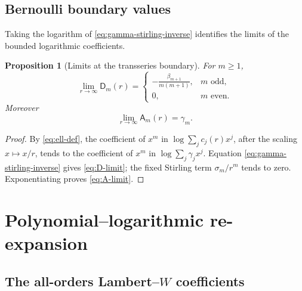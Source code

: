 \documentclass[11pt,a4paper]{article}
\newtheorem{proposition}[theorem]{Proposition}
\theoremstyle{definition}
\theoremstyle{remark}
\newcommand{\Bern}{\beta}
\newcommand{\cA}{\mathsf A}
\newcommand{\cD}{\mathsf D}
\begin{document}
\subsection{Bernoulli boundary values}

Taking the logarithm of \cref{eq:gamma-stirling-inverse} identifies the limits
of the bounded logarithmic coefficients.

\begin{proposition}[Limits at the transseries boundary]\label{prop:D-limits}
For \(m\ge1\),
\begin{equation}\label{eq:D-limit}
 \lim_{r\to\infty}\cD_m(r)=
 \begin{cases}
 \displaystyle-\frac{\Bern_{m+1}}{m(m+1)},&m\text{ odd},\\[2mm]
 0,&m\text{ even}.
 \end{cases}
\end{equation}
Moreover
\begin{equation}\label{eq:A-limit}
 \lim_{r\to\infty}\cA_m(r)=\gamma_m.
\end{equation}
\end{proposition}

\begin{proof}
By \cref{eq:ell-def}, the coefficient of \(x^m\) in
\(\log\sum_jc_j(r)x^j\), after the scaling \(x\mapsto x/r\), tends to the
coefficient of \(x^m\) in \(\log\sum_j\gamma_jx^j\).  Equation
\cref{eq:gamma-stirling-inverse} gives \cref{eq:D-limit}; the fixed Stirling
term \(\sigma_m/r^m\) tends to zero.  Exponentiating proves
\cref{eq:A-limit}.
\end{proof}

\section{Polynomial--logarithmic re-expansion}\label{sec:polylog}

\subsection{The all-orders Lambert--\texorpdfstring{\(W\)}{W} coefficients}
\end{document}
